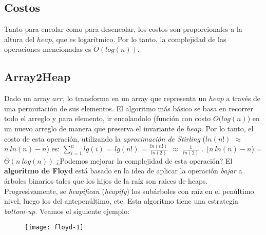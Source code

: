 \documentclass[10pt,a4paper]{article}
\begin{document}
\subsection{Costos}

Tanto para encolar como para desencolar, los costos son proporcionales a la altura del $heap$, que es logarítmico. Por lo tanto, la complejidad de las operaciones mencionadas es $O(log(n))$.

\subsection{Array2Heap}

Dado un array $arr$, lo transforma en un array que representa un $heap$ a través de una permutación de sus elementos.
\newline
\newline
El algoritmo más básico se basa en recorrer todo el arreglo y para elemento, ir encolandolo (función con costo $O(log(n)$) en un nuevo arreglo de manera que preserva el invariante de $heap$.
\newline
\newline
Por lo tanto, el costo de esta operación, utilizando la \textit{aproximación de Stirling} ($ln(n!)$ $\approx$ $n~ln(n) - n$) es:
\newline
\newline
$\displaystyle \sum_{i=1}^{n} lg(i)$ = $lg(n!)$ = $\displaystyle \frac{ln(n!)}{ln(2)}$ $\approx$ $\displaystyle \frac{1}{ln(2)}$ . ($n~ln(n) - n$) = $\Theta(n~log(n))$   
\newline
\newline
¿Podemos mejorar la complejidad de esta operación?
\newline
\newline
El \textbf{algoritmo de Floyd} está basado en la idea de aplicar la operación \textit{bajar} a árboles binarios tales que los hijos de la raíz son raices de heaps.
\newline
\newline
Progresivamente, se \textit{heapifican} (\textit{heapify}) los subárboles con raíz en el penúltimo nivel, luego los del antepenúltimo, etc.
\newline
\newline
Esta algoritmo tiene una estrategia \textit{bottom-up}.
\newline
\newline
Veamos el siguiente ejemplo:
\newline
\begin{figure}[h]
	\centering
\texttt{[image: floyd-1]}
	\label{drivers1}
\end{figure}
\end{document}
